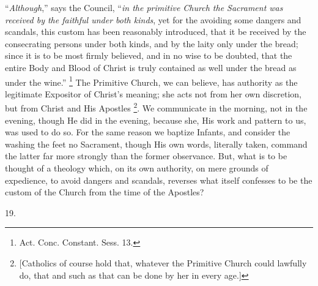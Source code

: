 ``\emph{Although},'' says the Council, ``\emph{in the
primitive Church the Sacrament was received by the faithful under both
kinds}, yet for the avoiding some dangers and scandals, this custom
has been reasonably introduced, that it be received by the
consecrating persons under both kinds, and by the laity only under the
bread; since it is to be most firmly believed, and in no wise to be
doubted, that the entire Body and Blood of Christ is truly contained
as well under the bread as under the wine.'' \footnote{Act. Conc. Constant. Sess. 13.} The Primitive Church, we can believe, has authority as the
legitimate Expositor of Christ's meaning; she acts not from her own
discretion, but from Christ and His Apostles \footnote{[Catholics of course hold that, whatever
the Primitive Church could lawfully do, that and such as that can be
done by her in every age.]}. We communicate in the morning, not in the evening, though He
did in the evening, because she, His work and pattern to us, was used
to do so. For the same reason we baptize Infants, and consider the
washing the feet no Sacrament, though His own words, literally taken,
command the latter far more strongly than the former observance. But,
what is to be thought of a theology which, on its own authority, on
mere grounds of expedience, to avoid dangers and scandals, reverses
what itself confesses to be the custom of the Church from the time of
the Apostles?

19.

